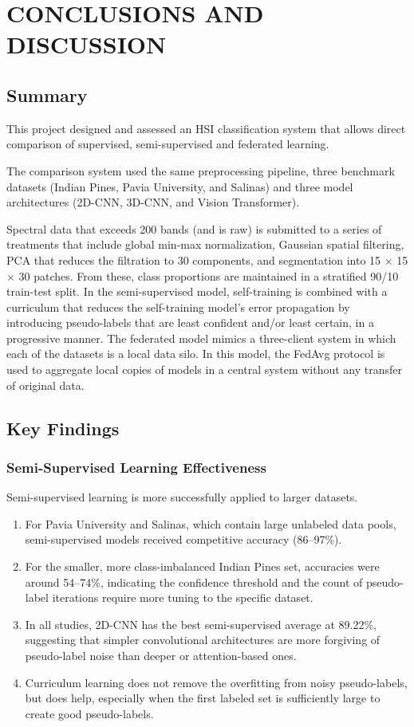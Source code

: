 \chapter{CONCLUSIONS AND DISCUSSION}

\section{Summary}
This project designed and assessed an HSI classification system that allows direct comparison of supervised, semi-supervised and federated learning.

The comparison system used the same preprocessing pipeline, three benchmark datasets (Indian Pines, Pavia University, and Salinas) and three model architectures (2D-CNN, 3D-CNN, and Vision Transformer).

Spectral data that exceeds 200 bands (and is raw) is submitted to a series of treatments that include global min-max normalization, Gaussian spatial filtering, PCA that reduces the filtration to 30 components, and segmentation into 15 × 15 × 30 patches. From these, class proportions are maintained in a stratified 90/10 train-test split. In the semi-supervised model, self-training is combined with a curriculum that reduces the self-training model’s error propagation by introducing pseudo-labels that are least confident and/or least certain, in a progressive manner. The federated model mimics a three-client system in which each of the datasets is a local data silo. In this model, the FedAvg protocol is used to aggregate local copies of models in a central system without any transfer of original data.

\section{Key Findings}

\subsection{Semi-Supervised Learning Effectiveness}
Semi-supervised learning is more successfully applied to larger datasets.
\begin{enumerate}
    \item For Pavia University and Salinas, which contain large unlabeled data pools, semi-supervised models received competitive accuracy (86--97\%).
    \item For the smaller, more class-imbalanced Indian Pines set, accuracies were around 54--74\%, indicating the confidence threshold and the count of pseudo-label iterations require more tuning to the specific dataset.
    \item In all studies, 2D-CNN has the best semi-supervised average at 89.22\%, suggesting that simpler convolutional architectures are more forgiving of pseudo-label noise than deeper or attention-based ones.
    \item Curriculum learning does not remove the overfitting from noisy pseudo-labels, but does help, especially when the first labeled set is sufficiently large to create good pseudo-labels.
\end{enumerate}

